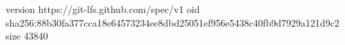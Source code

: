version https://git-lfs.github.com/spec/v1
oid sha256:88b30fa377cca18e64573234ee8dbd25051ef956e5438c40fb9d7929a121d9c2
size 43840

